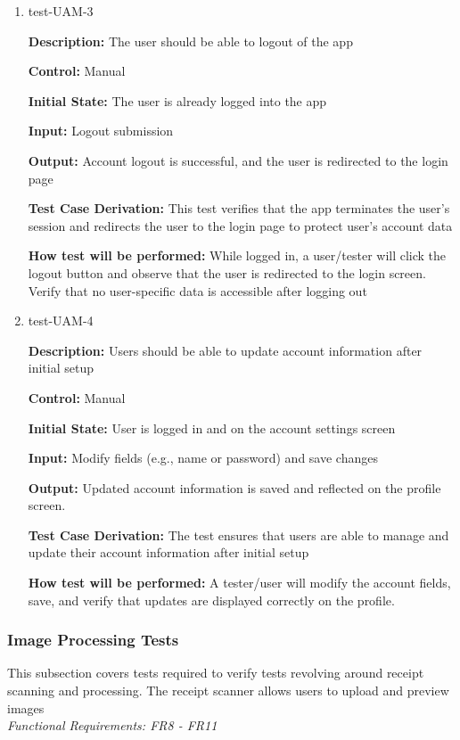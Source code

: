 \documentclass[12pt, titlepage]{article}
\begin{document}
\begin{enumerate}
\item{test-UAM-3\\}

\textbf{Description:} The user should be able to logout of the app

\textbf{Control:} Manual
					
\textbf{Initial State:} The user is already logged into the app
					
\textbf{Input:} Logout submission
					
\textbf{Output:} Account logout is successful, and the user is redirected to the login page

\textbf{Test Case Derivation:} This test verifies that the app terminates the user's session and redirects the user to the login page to protect user's account data

\textbf{How test will be performed:} While logged in, a user/tester will click the logout button and observe that the user is redirected to the login screen. Verify that no user-specific data is accessible after logging out

\item{test-UAM-4}

\textbf{Description:} Users should be able to update account information after initial setup

\textbf{Control:} Manual

\textbf{Initial State:} User is logged in and on the account settings screen

\textbf{Input:} Modify fields (e.g., name or password) and save changes

\textbf{Output:} Updated account information is saved and reflected on the profile screen.

\textbf{Test Case Derivation:} The test ensures that users are able to manage and update their account information after initial setup

\textbf{How test will be performed:} A tester/user will modify the account fields, save, and verify that updates are displayed correctly on the profile.
\end{enumerate}

\subsubsection{Image Processing Tests}

This subsection covers tests required to verify tests revolving around receipt scanning and processing. The receipt scanner allows users to upload and preview images\\
\textit{Functional Requirements: FR8 - FR11}
\end{document}
